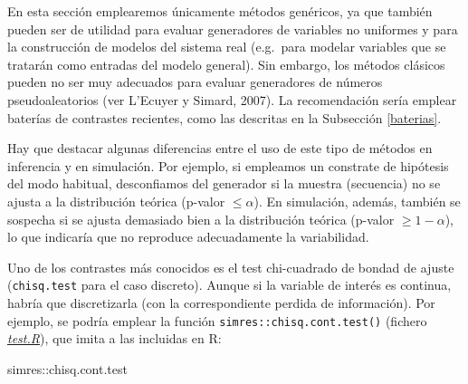 \documentclass[
]{book}
\newenvironment{Shaded}{\begin{snugshade}}{\end{snugshade}}
\newcommand{\NormalTok}[1]{#1}
\newcommand{\SpecialCharTok}[1]{\textcolor[rgb]{0.00,0.00,0.00}{#1}}
\theoremstyle{break}
\theoremstyle{nonumberplain}
\begin{document}
En esta sección emplearemos únicamente métodos genéricos, ya que también pueden ser de utilidad para evaluar generadores de variables no uniformes y para la construcción de modelos del sistema real (e.g.~para modelar variables que se tratarán como entradas del modelo general).
Sin embargo, los métodos clásicos pueden no ser muy adecuados para evaluar generadores de números pseudoaleatorios (ver L'Ecuyer y Simard, 2007).
La recomendación sería emplear baterías de contrastes recientes, como las descritas en la Subsección \ref{baterias}.

Hay que destacar algunas diferencias entre el uso de este tipo de métodos en inferencia y en simulación.
Por ejemplo, si empleamos un constrate de hipótesis del modo habitual, desconfiamos del generador si la muestra (secuencia) no se ajusta a la distribución teórica (p-valor \(\leq \alpha\)).
En simulación, además, también se sospecha si se ajusta demasiado bien a la distribución teórica (p-valor \(\geq1-\alpha\)), lo que indicaría que no reproduce adecuadamente la variabilidad.

Uno de los contrastes más conocidos es el test chi-cuadrado de bondad de ajuste (\texttt{chisq.test} para el caso discreto).
Aunque si la variable de interés es continua, habría que discretizarla (con la correspondiente perdida de información).
Por ejemplo, se podría emplear la función \texttt{simres::chisq.cont.test()} (fichero \href{R/test.R}{\emph{test.R}}), que imita a las incluidas en R:

\begin{Shaded}
\begin{Highlighting}[]
\NormalTok{simres}\SpecialCharTok{::}\NormalTok{chisq.cont.test}
\end{Highlighting}
\end{Shaded}
\end{document}
